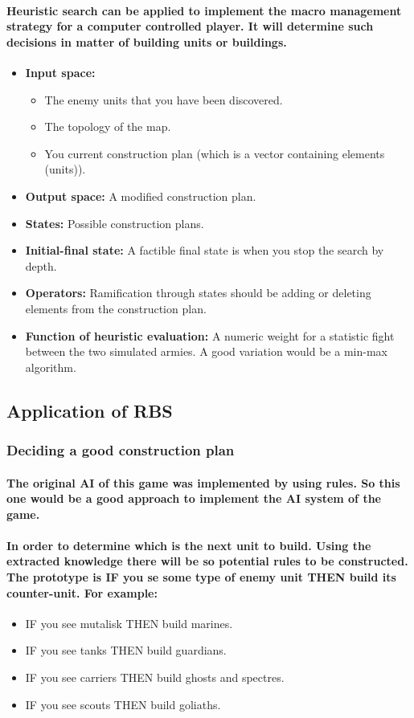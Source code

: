 \documentclass[a4paper,10pt]{article}
\newcommand{\p}[1]{\paragraph{\indent\textnormal{#1}}}
\begin{document}
	      \p{Heuristic search can be applied to implement the macro management strategy for a computer controlled player. It will determine such decisions in matter of building units or buildings.}

		  \begin{itemize}
		  \item \textbf{Input space:}
		    \begin{itemize}
			\item The enemy units that you have been discovered.
			\item The topology of the map.
			\item You current construction plan (which is a vector containing elements (units)).
		    \end{itemize}
		  \item \textbf{Output space:} A modified construction plan.
		  \item \textbf{States:} Possible construction plans. 
		  \item \textbf{Initial-final state:} A factible final state is when you stop the search by depth.
		  \item \textbf{Operators:} Ramification through states should be adding or deleting elements from the construction plan.
		  \item \textbf{Function of heuristic evaluation:} A numeric weight for a statistic fight between the two simulated armies. A good variation would be a min-max algorithm.
		  \end{itemize}

\subsection{Application of RBS}

\subsubsection{Deciding a good construction plan}

  \p{The original AI of this game was implemented by using rules. So this one would be a good approach to implement the AI system of the game.}
 
  \p{In order to determine which is the next unit to build. Using the extracted knowledge there will be so potential rules to be constructed. The prototype is IF you se some type of enemy unit THEN build its counter-unit. For example:}

  \begin{itemize}
    \item IF you see mutalisk THEN build marines.
    \item IF you see tanks THEN build guardians.
    \item IF you see carriers THEN build ghosts and spectres.
    \item IF you see scouts THEN build goliaths.
  \end{itemize}
\end{document}
